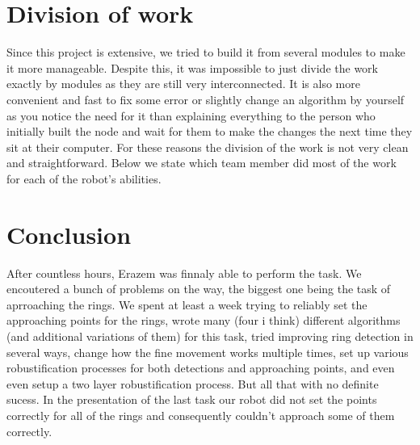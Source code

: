 \documentclass[12pt,a4paper]{article}
\begin{document}


	\section{Division of work}
	Since this project is extensive, we tried to build it from several modules to make it more manageable. Despite this, it was impossible to just divide the work exactly by modules as they are still very interconnected. It is also more convenient and fast to fix some error or slightly change an algorithm by yourself as you notice the need for it than explaining everything to the person who initially built the node and wait for them to make the changes the next time they sit at their computer. For these reasons the division of the work is not very clean and straightforward. Below we state which team member did most of the work for each of the robot's abilities.

	
	\section{Conclusion}
	After countless hours, Erazem was finnaly able to perform the task. We encoutered a bunch of problems on the way, the biggest one being the task of aprroaching the rings. We spent at least a week trying to reliably set the approaching points for the rings, wrote many (four i think) different algorithms (and additional variations of them) for this task, tried improving ring detection in several ways, change how the fine movement works multiple times, set up various robustification processes for both detections and approaching points, and even even setup a two layer robustification process. But all that with no definite sucess. In the presentation of the last task our robot did not set the points correctly for all of the rings and consequently couldn't approach some of them correctly. \\
\end{document}
